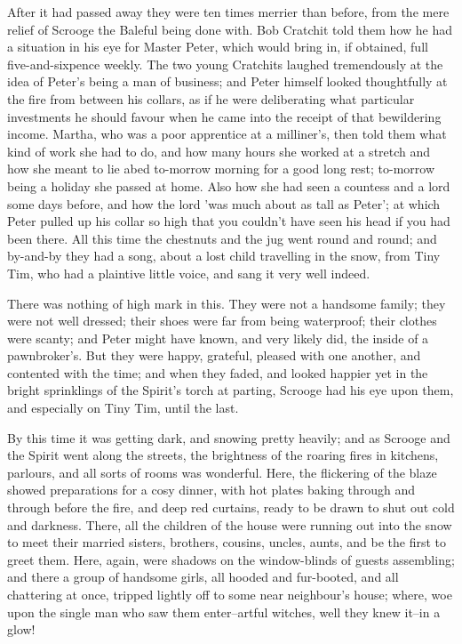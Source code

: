 After it had passed away they were ten times merrier than before, from
the mere relief of Scrooge the Baleful being done with. Bob Cratchit
told them how he had a situation in his eye for Master Peter, which
would bring in, if obtained, full five-and-sixpence weekly. The two
young Cratchits laughed tremendously at the idea of Peter's being a man
of business; and Peter himself looked thoughtfully at the fire from
between his collars, as if he were deliberating what particular
investments he should favour when he came into the receipt of that
bewildering income. Martha, who was a poor apprentice at a milliner's,
then told them what kind of work she had to do, and how many hours she
worked at a stretch and how she meant to lie abed to-morrow morning for
a good long rest; to-morrow being a holiday she passed at home. Also how
she had seen a countess and a lord some days before, and how the lord
'was much about as tall as Peter'; at which Peter pulled up his collar
so high that you couldn't have seen his head if you had been there. All
this time the chestnuts and the jug went round and round; and by-and-by
they had a song, about a lost child travelling in the snow, from Tiny
Tim, who had a plaintive little voice, and sang it very well indeed.

There was nothing of high mark in this. They were not a handsome family;
they were not well dressed; their shoes were far from being waterproof;
their clothes were scanty; and Peter might have known, and very likely
did, the inside of a pawnbroker's. But they were happy, grateful,
pleased with one another, and contented with the time; and when they
faded, and looked happier yet in the bright sprinklings of the Spirit's
torch at parting, Scrooge had his eye upon them, and especially on Tiny
Tim, until the last.

By this time it was getting dark, and snowing pretty heavily; and as
Scrooge and the Spirit went along the streets, the brightness of the
roaring fires in kitchens, parlours, and all sorts of rooms was
wonderful. Here, the flickering of the blaze showed preparations for a
cosy dinner, with hot plates baking through and through before the fire,
and deep red curtains, ready to be drawn to shut out cold and darkness.
There, all the children of the house were running out into the snow to
meet their married sisters, brothers, cousins, uncles, aunts, and be the
first to greet them. Here, again, were shadows on the window-blinds of
guests assembling; and there a group of handsome girls, all hooded and
fur-booted, and all chattering at once, tripped lightly off to some near
neighbour's house; where, woe upon the single man who saw them
enter--artful witches, well they knew it--in a glow!

